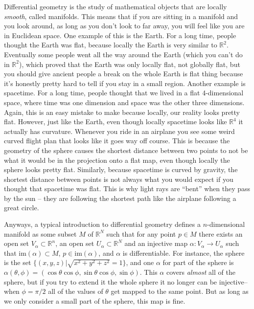\documentclass[]{book}
\begin{document}
Differential geometry is the study of mathematical objects that are locally \emph{smooth}, called manifolds. This means that if you are sitting in a manifold and you look around, as long as you don't look to far away, you will feel like you are in Euclidean space. One example of this is the Earth. For a long time, people thought the Earth was flat, because locally the Earth is very similar to $\mathbb{R}^2$.  Eventually some people went all the way around the Earth (which you can't do in $\mathbb{R}^2$), which proved that the Earth was only locally flat, not globally flat, but you should give ancient people a break on the whole Earth is flat thing because it's honestly pretty hard to tell if you stay in a small region. Another example is spacetime. For a long time, people thought that we lived in a flat 4-dimensional space, where time was one dimension and space was the other three dimensions.  Again, this is an easy mistake to make because locally, our reality looks pretty flat. However, just like the Earth, even though locally spacetime looks like $\mathbb{R}^4$ it actually has curvature.  Whenever you ride in an airplane you see some weird curved flight plan that looks like it goes way off course. This is because the geometry of the sphere causes the shortest distance between two points to not be what it would be in the projection onto a flat map, even though locally the sphere looks pretty flat. Similarly, because spacetime is curved by gravity, the shortest distance between points is not always what you would expect if you thought that spacetime was flat. This is why light rays are ``bent'' when they pass by the sun -- they are following the shortest path like the airplane following a great circle.

Anyways, a typical introduction to differential geometry defines a $n$-dimensional manifold as some subset $M$ of $\mathbb{R}^N$ such that for any point $p \in M$ there exists an open set $V_\alpha \subset \mathbb{R}^n$, an open set $U_\alpha \subset \mathbb{R}^N$ and an injective map $\alpha : V_\alpha \to U_\alpha$ such that $\mathrm{im}(\alpha) \subset M$, $p \in \mathrm{im}(\alpha)$, and $\alpha$ is differentiable. For instance, the sphere is the set $\{ (x,y,z) | \sqrt{x^2 + y^2 + z^2} = 1\}$, and one $\alpha$ for part of the sphere is $\alpha(\theta, \phi) = (\cos\theta\cos\phi, \sin\theta\cos\phi, \sin\phi)$.  This $\alpha$ covers \emph{almost} all of the sphere, but if you try to extend it the whole sphere it no longer can be injective--when $\phi = \pi/2$ all of the values of $\theta$ get mapped to the same point. But as long as we only consider a small part of the sphere, this map is fine.
\end{document}
